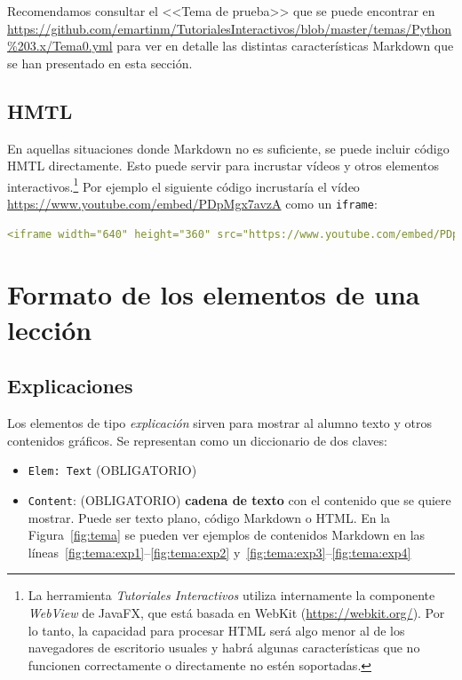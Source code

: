 \documentclass[]{article}
\newcommand{\code}[1]{{\lstinline[basicstyle=\ttfamily,mathescape]!#1!}}
\newcommand{\toolname}{\emph{Tutoriales Interactivos}}
\begin{document}
Recomendamos consultar el <<Tema de prueba>> que se puede encontrar en \url{https://github.com/emartinm/TutorialesInteractivos/blob/master/temas/Python%203.x/Tema0.yml} para ver en detalle las distintas características Markdown que se han presentado en esta sección.
	
	\subsection{HMTL}
	En aquellas situaciones donde Markdown no es suficiente, se puede incluir código HMTL directamente. Esto puede servir para incrustar vídeos y otros elementos interactivos.\footnote{La herramienta \toolname{} utiliza internamente la componente \emph{WebView} de JavaFX, que está basada en WebKit (\url{https://webkit.org/}). Por lo tanto, la capacidad para procesar HTML será algo menor al de los navegadores de escritorio usuales y habrá algunas características que no funcionen correctamente o directamente no estén soportadas.} Por ejemplo el siguiente código incrustaría el vídeo \url{https://www.youtube.com/embed/PDpMgx7avzA} como un \code{iframe}:
	\begin{lstlisting}[language=yaml,numbers=none]
	<iframe width="640" height="360" src="https://www.youtube.com/embed/PDpMgx7avzA" frameborder="0" allowfullscreen target="_self"></iframe>
	\end{lstlisting}	


\section{Formato de los elementos de una lección}\label{sec:elementos}

\subsection{Explicaciones}\label{sec:explicaciones}
Los elementos de tipo \emph{explicación} sirven para mostrar al alumno texto y otros contenidos gráficos. Se representan como un diccionario de dos claves:
\begin{itemize}
	 \item \code{Elem: Text} {\sf (OBLIGATORIO)}
	 \item \code{Content}: {\sf (OBLIGATORIO)} \textbf{cadena de texto} con el contenido que se quiere mostrar. Puede ser texto plano, código Markdown%
	 o HTML.
	 En la Figura~\ref{fig:tema} se pueden ver ejemplos de contenidos Markdown en las líneas~\ref{fig:tema:exp1}--\ref{fig:tema:exp2} y~\ref{fig:tema:exp3}--\ref{fig:tema:exp4}
\end{itemize}
\end{document}

